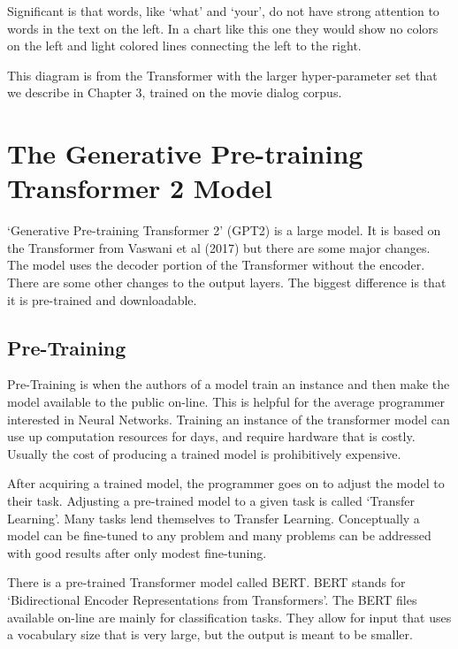 Significant is that words, like `what' and `your', do not have strong attention to words in the text on the left. In a chart like this one they would show no colors on the left and light colored lines connecting the left to the right.

This diagram is from the Transformer with the larger hyper-parameter set that we describe in Chapter 3, trained on the movie dialog corpus.



\section{The Generative Pre-training Transformer 2 Model}

`Generative Pre-training Transformer 2' (\ac{GPT2}) is a large model. It is based on the Transformer from Vaswani et al (2017)\cite{Vaswani2017AttentionIA} but there are some major changes. The model uses the decoder portion of the Transformer without the encoder. There are some other changes to the output layers. The biggest difference is that it is pre-trained and downloadable.

\subsection*{Pre-Training}
Pre-Training is when the authors of a model train an instance and then make the model available to the public on-line. This is helpful for the average programmer interested in Neural Networks. Training an instance of the transformer model can use up computation resources for days, and require hardware that is costly. Usually the cost of producing a trained model is prohibitively expensive.

After acquiring a trained model, the programmer goes on to adjust the model to their task. Adjusting a pre-trained model to a given task is called `Transfer Learning'. Many tasks lend themselves to Transfer Learning. Conceptually a model can be fine-tuned to any problem and many problems can be addressed with good results after only modest fine-tuning.

There is a pre-trained Transformer model called \ac{BERT}. BERT stands for `Bidirectional Encoder Representations from Transformers'. The BERT files available on-line are mainly for classification tasks. They allow for input that uses a vocabulary size that is very large, but the output is meant to be smaller.

